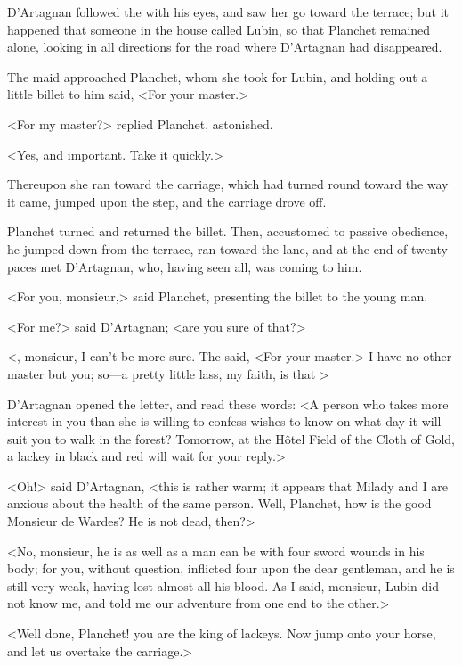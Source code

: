 D'Artagnan followed the  with his eyes, and saw her go toward the terrace; but it happened that someone in the house called Lubin, so that Planchet remained alone, looking in all directions for the road where D'Artagnan had disappeared. 

The maid approached Planchet, whom she took for Lubin, and holding out a little billet to him said, <For your master.> 

<For my master?> replied Planchet, astonished. 

<Yes, and important. Take it quickly.> 

Thereupon she ran toward the carriage, which had turned round toward the way it came, jumped upon the step, and the carriage drove off. 

Planchet turned and returned the billet. Then, accustomed to passive obedience, he jumped down from the terrace, ran toward the lane, and at the end of twenty paces met D'Artagnan, who, having seen all, was coming to him. 

<For you, monsieur,> said Planchet, presenting the billet to the young man. 

<For me?> said D'Artagnan; <are you sure of that?> 

<, monsieur, I can't be more sure. The  said, <For your master.> I have no other master but you; so—a pretty little lass, my faith, is that > 

D'Artagnan opened the letter, and read these words: <A person who takes more interest in you than she is willing to confess wishes to know on what day it will suit you to walk in the forest? Tomorrow, at the Hôtel Field of the Cloth of Gold, a lackey in black and red will wait for your reply.> 

<Oh!> said D'Artagnan, <this is rather warm; it appears that Milady and I are anxious about the health of the same person. Well, Planchet, how is the good Monsieur de Wardes? He is not dead, then?> 

<No, monsieur, he is as well as a man can be with four sword wounds in his body; for you, without question, inflicted four upon the dear gentleman, and he is still very weak, having lost almost all his blood. As I said, monsieur, Lubin did not know me, and told me our adventure from one end to the other.> 

<Well done, Planchet! you are the king of lackeys. Now jump onto your horse, and let us overtake the carriage.> 

